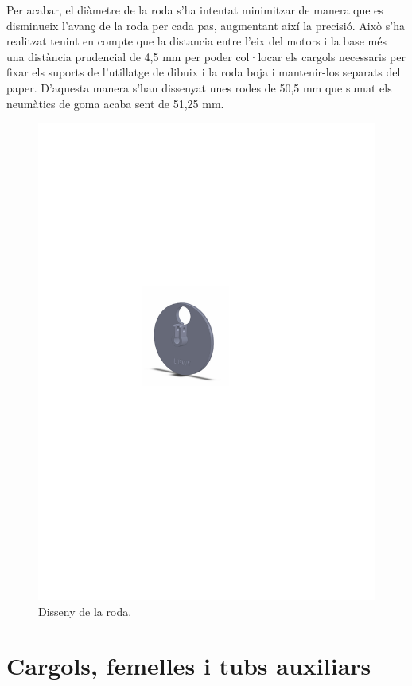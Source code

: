 Per acabar, el diàmetre de la roda s’ha intentat minimitzar de manera que es disminueix l’avanç de la roda per cada pas, augmentant així la precisió. Això s’ha realitzat tenint en compte que la distancia entre l’eix del motors i la base més una distància prudencial de 4,5 mm per poder col·locar els cargols necessaris per fixar els suports de l’utillatge de dibuix i la roda boja i mantenir-los separats del paper. D’aquesta manera s’han dissenyat unes rodes de 50,5 mm que sumat els neumàtics de goma acaba sent de 51,25 mm. 

\begin{figure}[H]
	\centering
	\includegraphics{roda}
	\caption{Disseny de la roda.}
	\label{fig:roda}
\end{figure}


\section{Cargols, femelles i tubs auxiliars}

